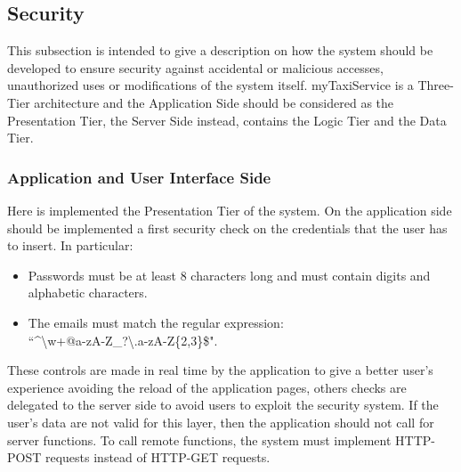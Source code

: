 \subsection{Security}
This subsection is intended to give a description on how the system should be developed to ensure security against accidental or malicious accesses, unauthorized uses or modifications of the system itself.
myTaxiService is a Three-Tier architecture and the Application Side should be considered as the Presentation Tier, the Server Side instead, contains the Logic Tier and the Data Tier.

	\subsubsection{Application and User Interface Side}
	Here is implemented the Presentation Tier of the system.
	On the application side should be implemented a first security check on the credentials that the user has to insert. In particular: 
		\begin{itemize}
			\item Passwords must be at least 8 characters long and must contain digits and alphabetic characters.
			\item The emails must match the regular expression:\\ \textquotedblleft\textasciicircum\textbackslash w+@\lbrack a-zA-Z\_\rbrack\plus?\textbackslash.\lbrack a-zA-Z\rbrack\{2,3\}\$".
		\end{itemize}  
	These controls are made in real time by the application to give a better user's experience avoiding the reload of the application pages, others checks are delegated to the server side to avoid users to exploit the security system.
	If the user's data are not valid for this layer, then the application should not call for server functions.
	To call remote functions, the system must implement HTTP-POST requests instead of HTTP-GET requests.

